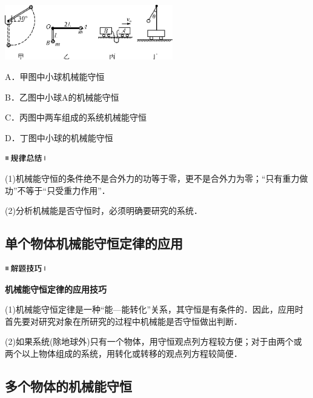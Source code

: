 \begin{center}\includegraphics[width=2.88681in,height=0.94306in]{media/image232.png}\end{center}

A．甲图中小球机械能守恒

B．乙图中小球A的机械能守恒

C．丙图中两车组成的系统机械能守恒

D．丁图中小球的机械能守恒

\begin{center}\includegraphics[width=0.70764in,height=0.12292in]{media/image44.png}\end{center}

(1)机械能守恒的条件绝不是合外力的功等于零，更不是合外力为零；``只有重力做功''不等于``只受重力作用''．

(2)分析机械能是否守恒时，必须明确要研究的系统．


\subsection{单个物体机械能守恒定律的应用}

\begin{center}\includegraphics[width=0.70764in,height=0.12292in]{media/image37.png}

\textbf{机械能守恒定律的应用技巧}
\end{center}


(1)机械能守恒定律是一种``能---能转化''关系，其守恒是有条件的．因此，应用时首先要对研究对象在所研究的过程中机械能是否守恒做出判断．

(2)如果系统(除地球外)只有一个物体，用守恒观点列方程较方便；对于由两个或两个以上物体组成的系统，用转化或转移的观点列方程较简便．



\newpage
\subsection{多个物体的机械能守恒}

